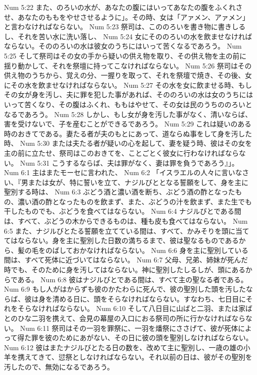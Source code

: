 Num 5:22  また、のろいの水が、あなたの腹にはいってあなたの腹をふくれさせ、あなたのももをやせさせるように」。その時、女は「アァメン、アァメン」と言わなければならない。
Num 5:23  祭司は、こののろいを書き物に書きしるし、それを苦い水に洗い落し、
Num 5:24  女にそののろいの水を飲ませなければならない。そののろいの水は彼女のうちにはいって苦くなるであろう。
Num 5:25  そして祭司はその女の手から疑いの供え物を取り、その供え物を主の前に揺り動かして、それを祭壇に持ってこなければならない。
Num 5:26  祭司はその供え物のうちから、覚えの分、一握りを取って、それを祭壇で焼き、その後、女にその水を飲ませなければならない。
Num 5:27  その水を女に飲ませる時、もしその女が身を汚し、夫に罪を犯した事があれば、そののろいの水は女のうちにはいって苦くなり、その腹はふくれ、ももはやせて、その女は民のうちののろいとなるであろう。
Num 5:28  しかし、もし女が身を汚した事がなく、清いならば、害を受けないで、子を産むことができるであろう。
Num 5:29  これは疑いのある時のおきてである。妻たる者が夫のもとにあって、道ならぬ事をして身を汚した時、
Num 5:30  または夫たる者が疑いの心を起して、妻を疑う時、彼はその女を主の前に立たせ、祭司はこのおきてを、ことごとく彼女に行わなければならない。
Num 5:31  こうするならば、夫は罪がなく、妻は罪を負うであろう』」。
Num 6:1  主はまたモーセに言われた、
Num 6:2  「イスラエルの人々に言いなさい、『男または女が、特に誓いを立て、ナジルびととなる誓願をして、身を主に聖別する時は、
Num 6:3  ぶどう酒と濃い酒を断ち、ぶどう酒の酢となったもの、濃い酒の酢となったものを飲まず、また、ぶどうの汁を飲まず、また生でも干したものでも、ぶどうを食べてはならない。
Num 6:4  ナジルびとである間は、すべて、ぶどうの木からできるものは、種も皮も食べてはならない。
Num 6:5  また、ナジルびとたる誓願を立てている間は、すべて、かみそりを頭に当ててはならない。身を主に聖別した日数の満ちるまで、彼は聖なるものであるから、髪の毛をのばしておかなければならない。
Num 6:6  身を主に聖別している間は、すべて死体に近づいてはならない。
Num 6:7  父母、兄弟、姉妹が死んだ時でも、そのために身を汚してはならない。神に聖別したしるしが、頭にあるからである。
Num 6:8  彼はナジルびとである間は、すべて主の聖なる者である。
Num 6:9  もし人がはからずも彼のかたわらに死んで、彼の聖別した頭を汚したならば、彼は身を清める日に、頭をそらなければならない。すなわち、七日目にそれをそらなければならない。
Num 6:10  そして八日目に山ばと二羽、または家ばとのひな二羽を携えて、会見の幕屋の入口におる祭司の所に行かなければならない。
Num 6:11  祭司はその一羽を罪祭に、一羽を燔祭にささげて、彼が死体によって得た罪を彼のためにあがない、その日に彼の頭を聖別しなければならない。
Num 6:12  彼はまたナジルびとたる日の数を、改めて主に聖別し、一歳の雄の小羊を携えてきて、愆祭としなければならない。それ以前の日は、彼がその聖別を汚したので、無効になるであろう。
